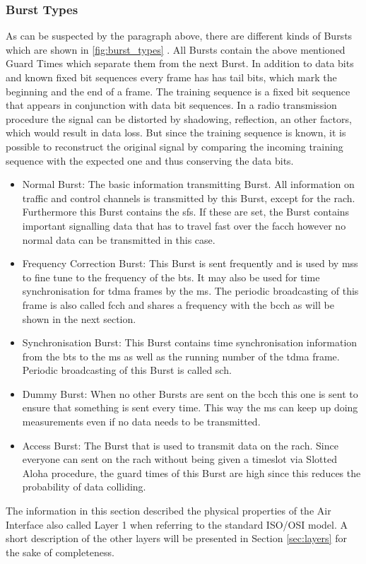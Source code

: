 \subsubsection{Burst Types}
As can be suspected by the paragraph above, there are different kinds of Bursts which are shown in \ref{fig:burst_types} \cite{GSM2009}.
All Bursts contain the above mentioned Guard Times which separate them from the next Burst.
In addition to data bits and known fixed bit sequences every frame has has tail bits, which mark the beginning and the end of a frame.
The training sequence is a fixed bit sequence that appears in conjunction with data bit sequences.
In a radio transmission procedure the signal can be distorted by shadowing, reflection, an other factors, which would result in data loss.
But since the training sequence is known, it is possible to reconstruct the original signal by comparing the incoming training sequence with the expected one and thus conserving the data bits.
\begin{itemize}
	\item Normal Burst: The basic information transmitting Burst.
	All information on traffic and control channels is transmitted by this Burst, except for the \gls{rach}.
	Furthermore this Burst contains the \glspl{sf}.
	If these are set, the Burst contains important signalling data that has to travel fast over the \gls{facch} however no normal data can be transmitted in this case.
	\item Frequency Correction Burst: This Burst is sent frequently and is used by \glspl{ms} to fine tune to the frequency of the \gls{bts}.
	It may also be used for time synchronisation for \gls{tdma} frames by the \gls{ms}.
	The periodic broadcasting of this frame is also called \gls{fcch} and shares a frequency with the \gls{bcch} as will be shown in the next section.
	\item Synchronisation Burst: This Burst contains time synchronisation information from the \gls{bts} to the \gls{ms} as well as the running number of the \gls{tdma} frame.
	Periodic broadcasting of this Burst is called \gls{sch}.
	\item Dummy Burst: When no other Bursts are sent on the \gls{bcch} this one is sent to ensure that something is sent every time.
	This way the \gls{ms} can keep up doing measurements even if no data needs to be transmitted.
	\item Access Burst: The Burst that is used to transmit data on the \gls{rach}.
	Since everyone can sent on the \gls{rach} without being given a timeslot via Slotted Aloha procedure, the guard times of this Burst are high since this reduces the probability of data colliding.
\end{itemize}
The information in this section described the physical properties of the Air Interface also called Layer 1 when referring to the standard ISO/OSI model.
A short description of the other layers will be presented in Section \ref{sec:layers} for the sake of completeness.

